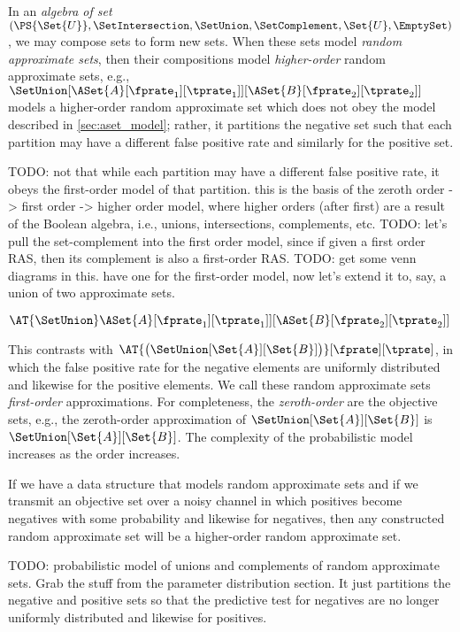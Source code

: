 \documentclass[ ../main.tex]{subfiles}
\begin{document}
In an \emph{algebra of set} $(\PS{\Set{U}}, \SetIntersection, \SetUnion, \SetComplement, \Set{U}, \EmptySet)$, we may compose sets to form new sets.
When these sets model \emph{random approximate sets}, then their compositions model \emph{higher-order} random approximate sets, e.g.,
$\SetUnion[\ASet{A}[\fprate_1][\tprate_1]][\ASet{B}[\fprate_2][\tprate_2]]$
models a higher-order random approximate set which does not obey the model described in \cref{sec:aset_model}; rather, it partitions the negative set such that each partition may have a different false positive rate and similarly for the positive set.


TODO: not that while each partition may have a different false positive rate, it obeys the first-order model of that partition. this is the basis of the zeroth order -> first order -> higher order model, where higher orders (after first) are a result of the Boolean algebra, i.e., unions, intersections, complements, etc.
TODO: let's pull the set-complement into the first order model, since if given a first order RAS, then its complement is also a first-order RAS.
TODO: get some venn diagrams in this. have one for the first-order model, now let's extend it to, say, a union of two approximate sets.

$\AT{\SetUnion} \ASet{A}[\fprate_1][\tprate_1]][\ASet{B}[\fprate_2][\tprate_2]]$

This contrasts with $\AT{\left(\SetUnion[\Set{A}][\Set{B}]\right)}[\fprate][\tprate]$, in which the false positive rate for the negative elements are uniformly distributed and likewise for the positive elements.
We call these random approximate sets \emph{first-order} approximations.
For completeness, the \emph{zeroth-order} are the objective sets, e.g., the zeroth-order approximation of $\SetUnion[\Set{A}][\Set{B}]$ is $\SetUnion[\Set{A}][\Set{B}]$.
The complexity of the probabilistic model increases as the order increases.


If we have a data structure that models random approximate sets and if we transmit an objective set over a noisy channel in which positives become negatives with some probability and likewise for negatives, then any constructed random approximate set will be a higher-order random approximate set.



TODO: probabilistic model of unions and complements of random approximate sets. Grab the stuff from the parameter distribution section. It just partitions the negative and positive sets so that the predictive test for negatives are no longer uniformly distributed and likewise for positives.
\end{document}

